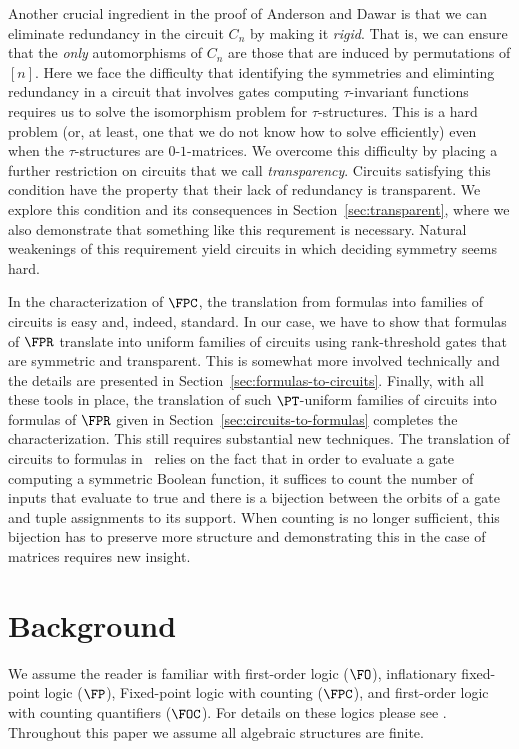 \documentclass[a4paper,UKenglish]{lipics-v2018}
\begin{document}
Another crucial ingredient in the proof of Anderson and Dawar is that we can
eliminate redundancy in the circuit $C_n$ by making it \emph{rigid}. That is, we
can ensure that the \emph{only} automorphisms of $C_n$ are those that are
induced by permutations of $[n]$. Here we face the difficulty that identifying
the symmetries and eliminting redundancy in a circuit that involves gates
computing $\tau$-invariant functions requires us to solve the isomorphism
problem for $\tau$-structures. This is a hard problem (or, at least, one that we
do not know how to solve efficiently) even when the $\tau$-structures are
$0$-$1$-matrices. We overcome this difficulty by placing a further restriction
on circuits that we call \emph{transparency}. Circuits satisfying this condition
have the property that their lack of redundancy is transparent. We explore this
condition and its consequences in Section~\ref{sec:transparent}, where we also
demonstrate that something like this requrement is necessary. Natural weakenings
of this requirement yield circuits in which deciding symmetry seems hard.

In the characterization of $\FPC$, the translation from formulas into families
of circuits is easy and, indeed, standard. In our case, we have to show that
formulas of $\FPR$ translate into uniform families of circuits using
rank-threshold gates that are symmetric and transparent. This is somewhat more
involved technically and the details are presented in
Section~\ref{sec:formulas-to-circuits}. Finally, with all these tools in place,
the translation of such $\PT$-uniform families of circuits into formulas of
$\FPR$ given in Section~\ref{sec:circuits-to-formulas} completes the
characterization. This still requires substantial new techniques. The
translation of circuits to formulas in~\cite{AndersonD17} relies on the fact
that in order to evaluate a gate computing a symmetric Boolean function, it
suffices to count the number of inputs that evaluate to true and there is a
bijection between the orbits of a gate and tuple assignments to its support.
When counting is no longer sufficient, this bijection has to preserve more
structure and demonstrating this in the case of matrices requires new insight.


\section{Background}
We assume the reader is familiar with first-order logic ($\FO$), inflationary
fixed-point logic ($\FP$), Fixed-point logic with counting ($\FPC$), and
first-order logic with counting quantifiers ($\FOC$). For details on these
logics please see \cite{grohe2017descriptive, immerman1999descriptive}.
Throughout this paper we assume all algebraic structures are finite.
\end{document}
